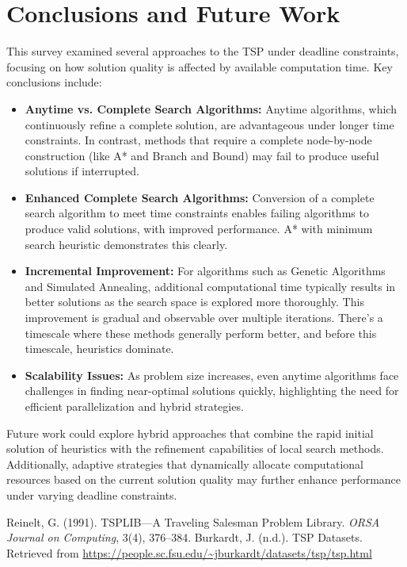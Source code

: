 \documentclass[11pt]{article}
\begin{document}
	\section{Conclusions and Future Work}
	This survey examined several approaches to the TSP under deadline constraints, focusing on how solution quality is affected by available computation time. Key conclusions include:
	\begin{itemize}[noitemsep]
		\item \textbf{Anytime vs. Complete Search Algorithms:} Anytime algorithms, which continuously refine a complete solution, are advantageous under longer time constraints. In contrast, methods that require a complete node-by-node construction (like A* and Branch and Bound) may fail to produce useful solutions if interrupted.
		\item \textbf {Enhanced Complete Search Algorithms:} Conversion of a complete search algorithm to meet time constraints enables failing algorithms to produce valid solutions, with improved performance. A* with minimum search heuristic demonstrates this clearly.
		\item \textbf{Incremental Improvement:} For algorithms such as Genetic Algorithms and Simulated Annealing, additional computational time typically results in better solutions as the search space is explored more thoroughly. This improvement is gradual and observable over multiple iterations. There's a timescale where these methods generally perform better, and before this timescale, heuristics dominate.
		\item \textbf{Scalability Issues:} As problem size increases, even anytime algorithms face challenges in finding near-optimal solutions quickly, highlighting the need for efficient parallelization and hybrid strategies.
	\end{itemize}
	
	Future work could explore hybrid approaches that combine the rapid initial solution of heuristics with the refinement capabilities of local search methods. Additionally, adaptive strategies that dynamically allocate computational resources based on the current solution quality may further enhance performance under varying deadline constraints.
	
	\begin{thebibliography}{9}
		Reinelt, G. (1991). TSPLIB—A Traveling Salesman Problem Library. \emph{ORSA Journal on Computing}, 3(4), 376--384.
		Burkardt, J. (n.d.). TSP Datasets. Retrieved from \url{https://people.sc.fsu.edu/~jburkardt/datasets/tsp/tsp.html}
	\end{thebibliography}
	
\end{document}
